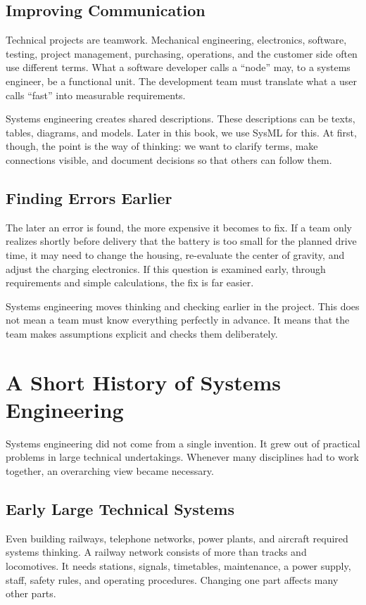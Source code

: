\subsection{Improving Communication}
Technical projects are teamwork. Mechanical engineering, electronics, software, testing, project management, purchasing, operations, and the customer side often use different terms. What a software developer calls a \enquote{node} may, to a systems engineer, be a functional unit. The development team must translate what a user calls \enquote{fast} into measurable requirements.

Systems engineering creates shared descriptions. These descriptions can be texts, tables, diagrams, and models. Later in this book, we use SysML for this. At first, though, the point is the way of thinking: we want to clarify terms, make connections visible, and document decisions so that others can follow them.

\subsection{Finding Errors Earlier}
The later an error is found, the more expensive it becomes to fix. If a team only realizes shortly before delivery that the battery is too small for the planned drive time, it may need to change the housing, re-evaluate the center of gravity, and adjust the charging electronics. If this question is examined early, through requirements and simple calculations, the fix is far easier.

Systems engineering moves thinking and checking earlier in the project. This does not mean a team must know everything perfectly in advance. It means that the team makes assumptions explicit and checks them deliberately.

\section{A Short History of Systems Engineering}
Systems engineering did not come from a single invention. It grew out of practical problems in large technical undertakings. Whenever many disciplines had to work together, an overarching view became necessary.

\subsection{Early Large Technical Systems}
Even building railways, telephone networks, power plants, and aircraft required systems thinking. A railway network consists of more than tracks and locomotives. It needs stations, signals, timetables, maintenance, a power supply, staff, safety rules, and operating procedures. Changing one part affects many other parts.


